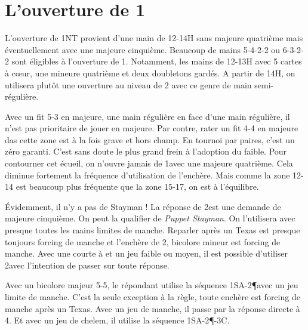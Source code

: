 \chapter{L'ouverture de 1\NT}

L'ouverture de 1NT provient d'une main de 12-14H sans majeure quatrième mais éventuellement avec une majeure cinquième. Beaucoup de mains 5-4-2-2 ou 6-3-2-2 sont éligibles à l'ouverture de 1\NT. Notamment, les mains de 12-13H avec 5 cartes à cœur, une mineure quatrième et deux doubletons gardés. A partir de 14H, on utilisera plutôt une ouverture au niveau de 2 avec ce genre de main semi-régulière.

Avec un fit 5-3 en majeure, une main régulière en face d'une main régulière, il n'est pas prioritaire de jouer en majeure. Par contre, rater un fit 4-4 en majeure das cette zone est à la fois grave et hors champ. En tournoi par paires, c'est un zéro garanti. C'est sans doute le plus grand frein à l'adoption du \NT faible.  Pour contourner cet écueil, on n'ouvre jamais de 1\NT avec une majeure quatrième. Cela diminue fortement la fréquence d'utilisation de l'enchère. Mais comme la zone 12-14 est beaucoup plus fréquente que la zone 15-17, on est à l'équilibre.

Évidemment, il n'y a pas de Stayman ! La  réponse de 2\T est une demande de majeure cinquième. On peut la qualifier de \textit{Puppet Stayman}. On l'utilisera avec presque toutes les mains limites de manche. Reparler après un Texas est presque toujours forcing de manche et l'enchère de 2\NT, bicolore mineur est forcing de manche.
Avec une courte à \T et un jeu faible ou moyen, il est possible d'utiliser 2\T avec l'intention de passer sur toute réponse.

Avec un bicolore majeur 5-5, le répondant utilise la séquence 1SA-2\P avec un jeu limite de manche. C'est la seule exception à la règle, toute enchère est forcing de manche après un Texas. Avec un jeu de manche, il passe par la réponse directe à 4\K. Et avec un jeu de chelem, il utilise la séquence 1SA-2\P-3C.




